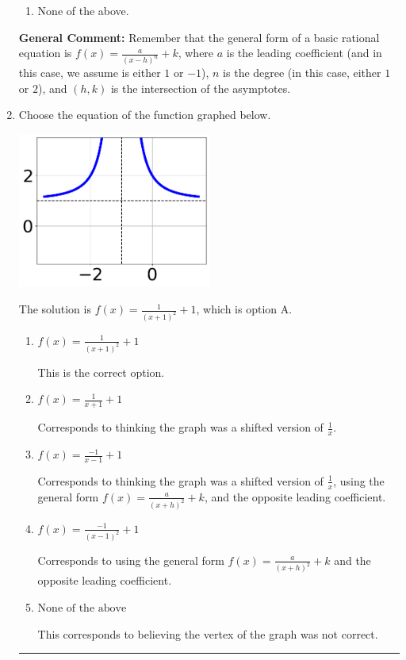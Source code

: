 \documentclass{extbook}[14pt]
\newcommand{\litem}[1]{\item #1

\rule{\textwidth}{0.4pt}}
\begin{document}
\begin{enumerate}
{\begin{enumerate}[label=\Alph*.]
\begin{multicols}{2}
\end{multicols}\item None of the above.\end{enumerate}
\textbf{General Comment:} Remember that the general form of a basic rational equation is $ f(x) = \frac{a}{(x-h)^n} + k$, where $a$ is the leading coefficient (and in this case, we assume is either $1$ or $-1$), $n$ is the degree (in this case, either $1$ or $2$), and $(h, k)$ is the intersection of the asymptotes.
}
\litem{
Choose the equation of the function graphed below.

\begin{center}
    \includegraphics[width=0.5\textwidth]{../Figures/rationalGraphToEquationCopyB.png}
\end{center}


The solution is \( f(x) = \frac{1}{(x + 1)^2} + 1 \), which is option A.\begin{enumerate}[label=\Alph*.]
\item \( f(x) = \frac{1}{(x + 1)^2} + 1 \)

This is the correct option.
\item \( f(x) = \frac{1}{x + 1} + 1 \)

Corresponds to thinking the graph was a shifted version of $\frac{1}{x}$.
\item \( f(x) = \frac{-1}{x - 1} + 1 \)

Corresponds to thinking the graph was a shifted version of $\frac{1}{x}$, using the general form $f(x) = \frac{a}{(x+h)^2}+k$, and the opposite leading coefficient.
\item \( f(x) = \frac{-1}{(x - 1)^2} + 1 \)

Corresponds to using the general form $f(x) = \frac{a}{(x+h)^2}+k$ and the opposite leading coefficient.
\item \( \text{None of the above} \)

This corresponds to believing the vertex of the graph was not correct.
\end{enumerate}

}
\end{enumerate}
\end{document}
